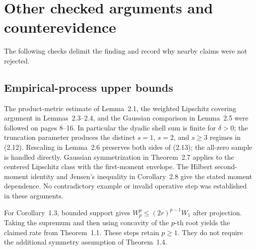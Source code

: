 \documentclass[10pt]{article}
\begin{document}
\section*{Other checked arguments and counterevidence}
The following checks delimit the finding and record why nearby claims were not rejected.\par
\subsection*{Empirical-process upper bounds}
The product-metric estimate of Lemma 2.1, the weighted Lipschitz covering argument in Lemmas 2.3–2.4, and the Gaussian comparison in Lemma 2.5 were followed on pages 8–16. In particular the dyadic shell sum is finite for \(\delta>0\); the truncation parameter produces the distinct \(s=1\), \(s=2\), and \(s\geq3\) regimes in (2.12). Rescaling in Lemma 2.6 preserves both sides of (2.13); the all-zero sample is handled directly. Gaussian symmetrization in Theorem 2.7 applies to the centered Lipschitz class with the first-moment envelope. The Hilbert second-moment identity and Jensen’s inequality in Corollary 2.8 give the stated moment dependence. No contradictory example or invalid operative step was established in these arguments.\par
For Corollary 1.3, bounded support gives \(W_p^p\leq(2r)^{p-1}W_1\) after projection. Taking the supremum and then using concavity of the \(p\)-th root yields the claimed rate from Theorem 1.1. These steps retain \(p\geq1\). They do not require the additional symmetry assumption of Theorem 1.4.\par
\end{document}
